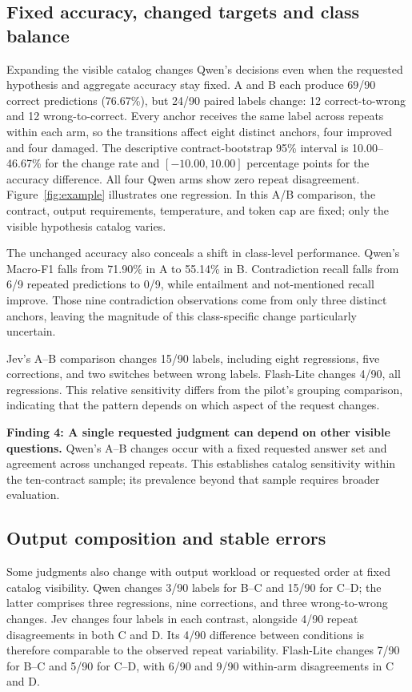 \subsection{Fixed accuracy, changed targets and class balance}
Expanding the visible catalog changes Qwen's decisions even when the requested hypothesis and aggregate accuracy stay fixed. A and B each produce 69/90 correct predictions (76.67\%), but 24/90 paired labels change: 12 correct-to-wrong and 12 wrong-to-correct. Every anchor receives the same label across repeats within each arm, so the transitions affect eight distinct anchors, four improved and four damaged. The descriptive contract-bootstrap 95\% interval is 10.00--46.67\% for the change rate and $[-10.00,10.00]$ percentage points for the accuracy difference. All four Qwen arms show zero repeat disagreement. Figure~\ref{fig:example} illustrates one regression. In this A/B comparison, the contract, output requirements, temperature, and token cap are fixed; only the visible hypothesis catalog varies.

The unchanged accuracy also conceals a shift in class-level performance. Qwen's Macro-F1 falls from 71.90\% in A to 55.14\% in B. Contradiction recall falls from 6/9 repeated predictions to 0/9, while entailment and not-mentioned recall improve. Those nine contradiction observations come from only three distinct anchors, leaving the magnitude of this class-specific change particularly uncertain.

Jev's A--B comparison changes 15/90 labels, including eight regressions, five corrections, and two switches between wrong labels. Flash-Lite changes 4/90, all regressions. This relative sensitivity differs from the pilot's grouping comparison, indicating that the pattern depends on which aspect of the request changes.

\textbf{Finding 4: A single requested judgment can depend on other visible questions.} Qwen's A--B changes occur with a fixed requested answer set and agreement across unchanged repeats. This establishes catalog sensitivity within the ten-contract sample; its prevalence beyond that sample requires broader evaluation.

\subsection{Output composition and stable errors}
Some judgments also change with output workload or requested order at fixed catalog visibility. Qwen changes 3/90 labels for B--C and 15/90 for C--D; the latter comprises three regressions, nine corrections, and three wrong-to-wrong changes. Jev changes four labels in each contrast, alongside 4/90 repeat disagreements in both C and D. Its 4/90 difference between conditions is therefore comparable to the observed repeat variability. Flash-Lite changes 7/90 for B--C and 5/90 for C--D, with 6/90 and 9/90 within-arm disagreements in C and D.

